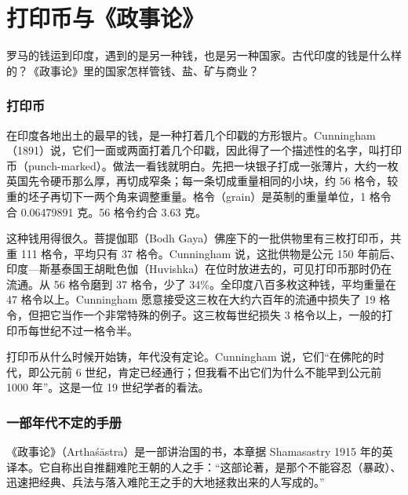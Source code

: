 
\section{打印币与《政事论》}\label{sec:india-artha}

罗马的钱运到印度，遇到的是另一种钱，也是另一种国家。古代印度的钱是什么样的？《政事论》里的国家怎样管钱、盐、矿与商业？

\subsubsection{打印币}
在印度各地出土的最早的钱，是一种打着几个印戳的方形银片。Cunningham（1891）说，它们一面或两面打着几个印戳，因此得了一个描述性的名字，叫打印币（punch-marked）\cite{cunningham1891}。做法一看钱就明白。先把一块银子打成一张薄片，大约一枚英国先令硬币那么厚，再切成窄条；每一条切成重量相同的小块，约 56 格令，较重的坯子再切下一两个角来调整重量\cite{cunningham1891}。格令（grain）是英制的重量单位，1 格令合 0.06479891 克。56 格令约合 3.63 克。

这种钱用得很久。菩提伽耶（Bodh Gaya）佛座下的一批供物里有三枚打印币，共重 111 格令，平均只有 37 格令。Cunningham 说，这批供物是公元 150 年前后、印度—斯基泰国王胡毗色伽（Huvishka）在位时放进去的，可见打印币那时仍在流通。从 56 格令磨到 37 格令，少了 34\%。全印度八百多枚这种钱，平均重量在 47 格令以上。Cunningham 愿意接受这三枚在大约六百年的流通中损失了 19 格令，但把它当作一个非常特殊的例子\cite{cunningham1891}。这三枚每世纪损失 3 格令以上，一般的打印币每世纪不过一格令半。

打印币从什么时候开始铸，年代没有定论。Cunningham 说，它们“在佛陀的时代，即公元前 6 世纪，肯定已经通行；但我看不出它们为什么不能早到公元前 1000 年”\cite{cunningham1891}。这是一位 19 世纪学者的看法。

\subsubsection{一部年代不定的手册}
《政事论》（Arthaśāstra）是一部讲治国的书，本章据 Shamasastry 1915 年的英译本。它自称出自推翻难陀王朝的人之手：“这部论著，是那个不能容忍（暴政）、迅速把经典、兵法与落入难陀王之手的大地拯救出来的人写成的。”\cite{arthashastra}

